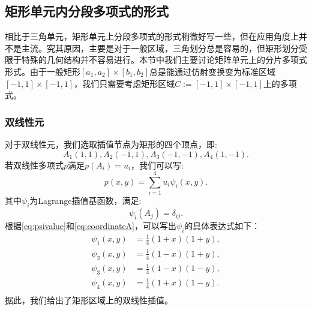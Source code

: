 \subsection{矩形单元内分段多项式的形式}
相比于三角单元，矩形单元上分段多项式的形式稍微好写一些，但在应用角度上并不是主流。究其原因，主要是对于一般区域，三角划分总是容易的，但矩形划分受限于特殊的几何结构并不容易进行。本节中我们主要讨论矩阵单元上的分片多项式形式。由于一般矩形$[a_{1},a_{2}]\times[b_{1},b_{2}]$总是能通过仿射变换变为标准区域$[-1,1]\times[-1,1]$，我们只需要考虑矩形区域$C:=[-1,1]\times[-1,1]$上的多项式。
\subsubsection{双线性元}
对于双线性元，我们选取插值节点为矩形的四个顶点，即:
\begin{equation}
    \label{eq:coordinateA}
    A_{1}(1,1),A_{2}(-1,1),A_{3}(-1,-1),A_{4}(1,-1).
\end{equation}
若双线性多项式$p$满足$p(A_{i})=u_{i}$，我们可以写:
\begin{equation}
    p(x,y)=\sum_{i=1}^{4}u_{i}{\psi}_{i}(x,y).
\end{equation}
其中$\psi_{i}$为Lagrange插值基函数，满足:
\begin{equation}
    \label{eq:psivalue}
    \psi_{i}(A_{j})=\delta_{ij}.
\end{equation}
根据\eqref{eq:psivalue}和\eqref{eq:coordinateA}，可以写出$\psi_{i}$的具体表达式如下：
\begin{equation}
    \label{eq:psiexpression}
    \begin{aligned}
        \psi_{1}(x,y)&=\frac{1}{4}(1+x)(1+y),\\
        \psi_{2}(x,y)&=\frac{1}{4}(1-x)(1+y),\\
        \psi_{3}(x,y)&=\frac{1}{4}(1-x)(1-y),\\
        \psi_{4}(x,y)&=\frac{1}{4}(1+x)(1-y).\\
    \end{aligned}
\end{equation}
据此，我们给出了矩形区域上的双线性插值。
